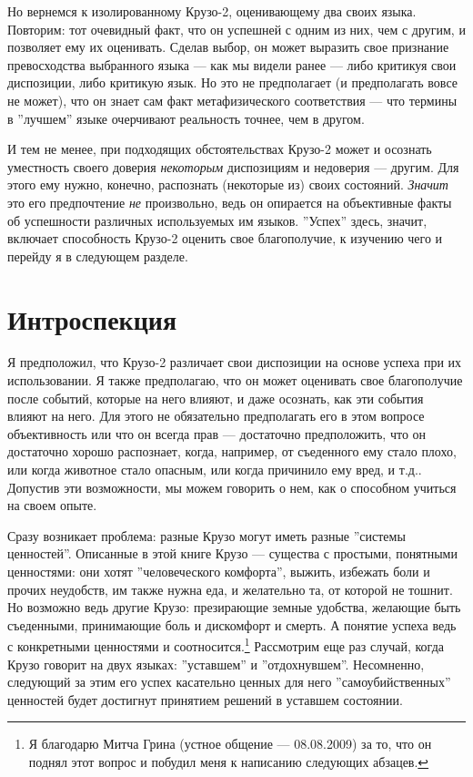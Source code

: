 \documentclass[11pt]{book}
\begin{document}
Но вернемся к изолированному Крузо-2, оценивающему два своих языка. Повторим: тот очевидный факт, что он успешней с одним из них, чем с другим, и позволяет ему их оценивать. Сделав выбор, он может выразить свое признание превосходства выбранного языка --- как мы видели ранее --- либо критикуя свои диспозиции, либо критикую язык. Но это не предполагает (и предполагать вовсе не может), что он знает сам факт метафизического соответствия --- что термины в ''лучшем'' языке очерчивают реальность точнее, чем в другом.

И тем не менее, при подходящих обстоятельствах Крузо-2 может и осознать уместность своего доверия \textit{некоторым} диспозициям и недоверия --- другим. Для этого ему нужно, конечно, распознать (некоторые из) своих состояний. \textit{Значит} это его предпочтение \textit{не} произвольно, ведь он опирается на объективные факты об успешности различных используемых им языков. ''Успех'' здесь, значит, включает способность Крузо-2 оценить свое благополучие, к изучению чего и перейду я в следующем разделе.

\section{Интроспекция}

Я предположил, что Крузо-2 различает свои диспозиции на основе успеха при их использовании. Я также предполагаю, что он может оценивать свое благополучие после событий, которые на него влияют, и даже осознать, как эти события влияют на него. Для этого не обязательно предполагать его в этом вопросе объективность или что он всегда прав --- достаточно предположить, что он достаточно хорошо распознает, когда, например, от съеденного ему стало плохо, или когда животное стало опасным, или когда причинило ему вред, и т.д.. Допустив эти возможности, мы можем говорить о нем, как о способном учиться на своем опыте.

Сразу возникает проблема: разные Крузо могут иметь разные ''системы ценностей''. Описанные в этой книге Крузо --- существа с простыми, понятными ценностями: они хотят ''человеческого комфорта'', выжить, избежать боли и прочих неудобств, им также нужна еда, и желательно та, от которой не тошнит. Но возможно ведь другие Крузо: презирающие земные удобства, желающие быть съеденными, принимающие боль и дискомфорт и смерть. А понятие успеха ведь с конкретными ценностями и соотносится.\footnote{Я благодарю Митча Грина (устное общение --- 08.08.2009) за то, что он поднял этот вопрос и побудил меня к написанию следующих абзацев.} Рассмотрим еще раз случай, когда Крузо говорит на двух языках: ''уставшем'' и ''отдохнувшем''. Несомненно, следующий за этим его успех касательно ценных для него ''самоубийственных'' ценностей будет достигнут принятием решений в уставшем состоянии.
\end{document}

